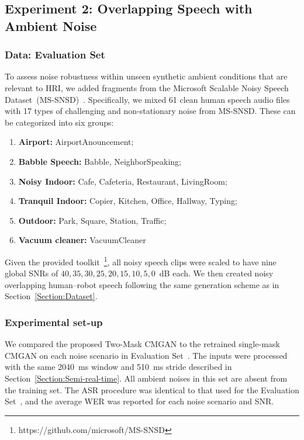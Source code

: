 \documentclass[manuscript,screen,review]{acmart}
\newcommand{\RomanNumeralCaps}[1]
    {\MakeUppercase{\romannumeral #1}}
\begin{document}
\subsection{Experiment 2: Overlapping Speech with Ambient Noise}

\subsubsection{Data: Evaluation Set \RomanNumeralCaps{2}}
To assess noise robustness within unseen synthetic ambient conditions that are relevant to HRI, we added fragments from the Microsoft Scalable Noisy Speech Dataset~(MS-SNSD)~\cite{reddy2019scalable}. Specifically, we mixed 61 clean human speech audio files with 17 types of challenging and non-stationary noise from MS-SNSD. These can be categorized into six groups:
\begin{enumerate}
    \item %
    \textbf{Airport:} AirportAnouncement;
    \item %
    \textbf{Babble Speech:} 
    Babble, NeighborSpeaking;
    \item %
    \textbf{Noisy Indoor:} 
    Cafe, Cafeteria, Restaurant, LivingRoom;
    \item %
    \textbf{Tranquil Indoor:} Copier, Kitchen, Office, Hallway, Typing;
    \item %
    \textbf{Outdoor:} Park, Square, Station, Traffic;
    \item %
    \textbf{Vacuum cleaner:} VacuumCleaner
\end{enumerate}
Given the provided toolkit~\footnote{https://github.com/microsoft/MS-SNSD}, all noisy speech clips were scaled to have nine global SNRs of ${40,35,30,25,20,15,10,5,0}$~dB each. We then created noisy overlapping human--robot speech following the same generation scheme as in Section~\ref{Section:Dataset}. 


\subsubsection{Experimental set-up}
We compared the proposed Two-Mask CMGAN to the retrained single-mask CMGAN on each noise scenario in Evaluation Set~\RomanNumeralCaps{2}. The inputs were processed with the same 2040~ms window and 510~ms stride described in Section~\ref{Section:Semi-real-time}. All ambient noises in this set are absent from the training set. The ASR procedure was identical to that used for the Evaluation Set~\RomanNumeralCaps{1}, and the average WER was reported for each noise scenario and SNR.
\end{document}
